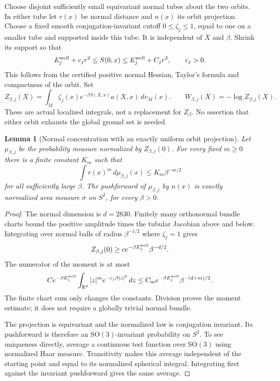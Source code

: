 \documentclass[11pt,oneside]{article}
\newtheorem{lemma}[theorem]{Lemma}
\begin{document}
Choose disjoint sufficiently small equivariant normal
tubes about the two orbits. In either tube let \(r(x)\)
be normal distance and \(n(x)\) its orbit projection.
Choose a fixed smooth conjugation-invariant cutoff
\(0\le\zeta_j\le1\), equal to one on a smaller tube and
supported inside this tube. It is independent of \(X\)
and \(\beta\). Shrink its support so that
\begin{equation}\label{eq:f13v10-normal}
 E_j^{\rm well}+c_jr^2
 \le S(0,x)\le E_j^{\rm well}+C_jr^2,\qquad c_j>0.
\end{equation}
This follows from the certified positive normal Hessian,
Taylor's formula and compactness of the orbit.
Set
\[
 Z_{\beta,j}(X)=\int_M\zeta_j(x)e^{-\beta S(X,x)}
                              a(X,x)\,dv_M(x).
 \qquad W_{\beta,j}(X)=-\log Z_{\beta,j}(X).
\]
These are actual localized integrals, not a replacement
for \(Z_\beta\). No assertion that either orbit exhausts
the global ground set is needed.

\begin{lemma}[Normal concentration with an exactly uniform orbit projection]
\label{lem:f13v10-concentration}
Let \(\mu_{\beta,j}\) be the probability measure
normalized by \(Z_{\beta,j}(0)\). For every fixed \(m\ge0\)
there is a finite constant \(K_m\) such that
\[
 \int r(x)^m\,d\mu_{\beta,j}(x)\le K_m\beta^{-m/2}
\]
for all sufficiently large \(\beta\). The pushforward
of \(\mu_{\beta,j}\) by \(n(x)\) is exactly normalized
area measure \(\sigma\) on \(S^2\), for every \(\beta>0\).
\end{lemma}

\begin{proof}
The normal dimension is \(d=2830\). Finitely many
orthonormal bundle charts bound the positive amplitude
times the tubular Jacobian above and below. Integrating
over normal balls of radius \(\beta^{-1/2}\) where
\(\zeta_j=1\) gives
\[
 Z_{\beta,j}(0)\ge c e^{-\beta E_j^{\rm well}}\beta^{-d/2}.
\]
The numerator of the moment is at most
\[
 C e^{-\beta E_j^{\rm well}}
          \int_{\mathbb R^d}|z|^m e^{-c_j\beta|z|^2}\,dz
 \le C_m e^{-\beta E_j^{\rm well}}\beta^{-(d+m)/2}.
\]
The finite chart sum only changes the constants.
Division proves the moment estimate; it does not require
a globally trivial normal bundle.

The projection is equivariant and the normalized law is
conjugation invariant. Its pushforward is therefore an
\(\mathrm{SO}(3)\)-invariant probability on \(S^2\).
To see uniqueness directly, average a continuous test
function over \(\mathrm{SO}(3)\) using normalized Haar
measure. Transitivity makes this average independent of
the starting point and equal to its normalized spherical
integral. Integrating first against the invariant
pushforward gives the same average.
\end{proof}
\end{document}

